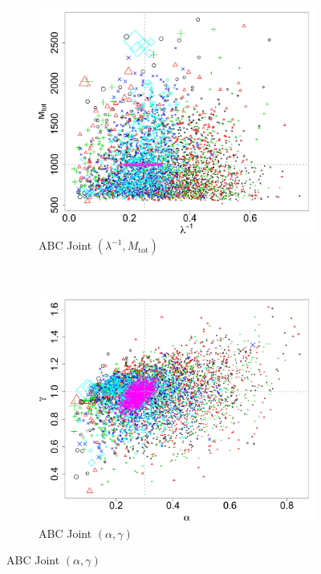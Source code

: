 \documentclass[ejs]{imsart}
\numberwithin{equation}{section}
\theoremstyle{plain}
\newcommand{\Mtot}{M_{\text{tot}}}
\begin{document}
\begin{figure}[htbp]
\begin{subfigure}{0.32\textwidth}
\end{subfigure}
\begin{subfigure}{0.32\textwidth}
\centering
\includegraphics[width = \textwidth]{figures/joint_k_mtot_obs.pdf} 
\caption{ABC Joint $(\lambda^{-1}, \Mtot)$}\label{subfig:joint_mtot_k_obs}
\end{subfigure} \\
\begin{subfigure}{0.32\textwidth}
\centering
\includegraphics[width = \textwidth]{figures/joint_alpha_gamma_obs.pdf} 
\caption{ABC Joint $(\alpha, \gamma)$}\label{subfig:joint_gamma_alpha_obs}

\end{subfigure}
\end{figure}
\end{document}
